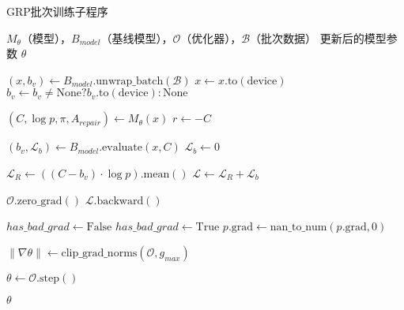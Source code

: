\begin{algorithm}[H]
    \begin{algorithmic}[1]
        \caption{GRP批次训练子程序}
        \label{alg:grp_batch_training}
        \Require $M_{\theta}$（模型），$B_{model}$（基线模型），$\mathcal{O}$（优化器），$\mathcal{B}$（批次数据）
        \Ensure 更新后的模型参数 $\theta$
        
        \State $(x, b_v) \leftarrow B_{model}.\text{unwrap\_batch}(\mathcal{B})$ 
        \State $x \leftarrow x.\text{to}(\text{device})$ 
        \State $b_v \leftarrow b_v \neq \text{None} ? b_v.\text{to}(\text{device}) : \text{None}$
        
        \State $(C, \log p, \pi, A_{repair}) \leftarrow M_{\theta}(x)$ 
        \State $r \leftarrow -C$ 
        
            \State $(b_v, \mathcal{L}_{b}) \leftarrow B_{model}.\text{evaluate}(x, C)$ 
        \Else
            \State $\mathcal{L}_{b} \leftarrow 0$ 
        \EndIf
        
        \State $\mathcal{L}_{R} \leftarrow ((C - b_v) \cdot \log p).\text{mean}()$ 
        \State $\mathcal{L} \leftarrow \mathcal{L}_{R} + \mathcal{L}_{b}$ 
        
        \State $\mathcal{O}.\text{zero\_grad}()$ 
        \State $\mathcal{L}.\text{backward}()$ 
        
        \State $has\_bad\_grad \leftarrow \text{False}$ 
                \State $has\_bad\_grad \leftarrow \text{True}$
                \State $p.\text{grad} \leftarrow \text{nan\_to\_num}(p.\text{grad}, 0)$ 
            \EndIf
        \EndFor
        
        \State $\|\nabla\theta\| \leftarrow \text{clip\_grad\_norms}(\mathcal{O}, g_{max})$ 
        
            \State $\theta \leftarrow \mathcal{O}.\text{step}()$ 
        \EndIf
        
        \State \Return $\theta$ 
    \end{algorithmic}
\end{algorithm}